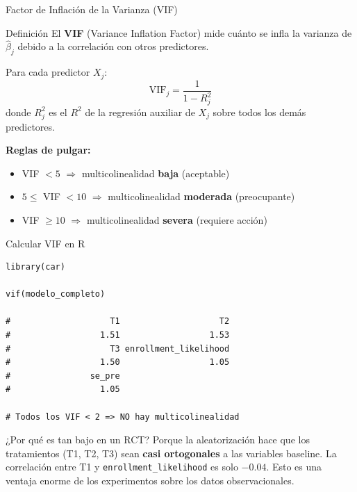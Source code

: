 \documentclass[aspectratio=169, 11pt]{beamer}
\begin{document}
\begin{frame}{Factor de Inflación de la Varianza (VIF)}
\begin{block}{Definición}
El \textbf{VIF} (Variance Inflation Factor) mide cuánto se infla la varianza de $\hat{\beta}_j$ debido a la correlación con otros predictores.

Para cada predictor $X_j$:
\[
\text{VIF}_j = \frac{1}{1 - R_j^2}
\]
donde $R_j^2$ es el $R^2$ de la regresión auxiliar de $X_j$ sobre todos los demás predictores.
\end{block}

\vspace{0.2cm}
\textbf{Reglas de pulgar:}
\begin{itemize}
  \item VIF $< 5$ $\Rightarrow$ multicolinealidad \textbf{baja} (aceptable)
  \item $5 \leq$ VIF $< 10$ $\Rightarrow$ multicolinealidad \textbf{moderada} (preocupante)
  \item VIF $\geq 10$ $\Rightarrow$ multicolinealidad \textbf{severa} (requiere acción)
\end{itemize}
\end{frame}

\begin{frame}[fragile]{Calcular VIF en R}
\begin{lstlisting}[basicstyle=\ttfamily\scriptsize]
library(car)

vif(modelo_completo)

#                    T1                    T2
#                  1.51                  1.53
#                    T3 enrollment_likelihood
#                  1.50                  1.05
#                se_pre
#                  1.05

# Todos los VIF < 2 => NO hay multicolinealidad
\end{lstlisting}

\vspace{0.2cm}
\begin{exampleblock}{¿Por qué es tan bajo en un RCT?}
\small
Porque la aleatorización hace que los tratamientos (T1, T2, T3) sean \textbf{casi ortogonales} a las variables baseline. La correlación entre T1 y \texttt{enrollment\_likelihood} es solo $-0.04$. Esto es una ventaja enorme de los experimentos sobre los datos observacionales.
\end{exampleblock}
\end{frame}
\end{document}
